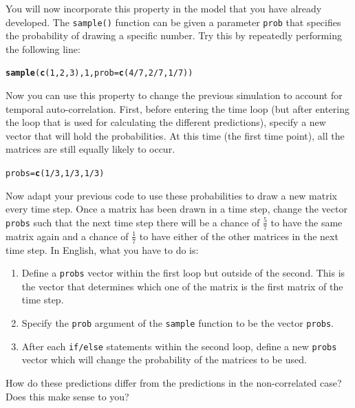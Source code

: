 \documentclass{article}\usepackage[]{graphicx}\usepackage[]{color}
\makeatletter
\newcommand{\hlnum}[1]{\textcolor[rgb]{0.686,0.059,0.569}{#1}}%
\newcommand{\hlopt}[1]{\textcolor[rgb]{0,0,0}{#1}}%
\newcommand{\hlstd}[1]{\textcolor[rgb]{0.345,0.345,0.345}{#1}}%
\newcommand{\hlkwb}[1]{\textcolor[rgb]{0.69,0.353,0.396}{#1}}%
\newcommand{\hlkwc}[1]{\textcolor[rgb]{0.333,0.667,0.333}{#1}}%
\newcommand{\hlkwd}[1]{\textcolor[rgb]{0.737,0.353,0.396}{\textbf{#1}}}%
\newenvironment{kframe}{%
 \def\at@end@of@kframe{}%
 \ifinner\ifhmode%
  \def\at@end@of@kframe{\end{minipage}}%
  \begin{minipage}{\columnwidth}%
 \fi\fi%
 \def\FrameCommand##1{\hskip\@totalleftmargin \hskip-\fboxsep
 \colorbox{shadecolor}{##1}\hskip-\fboxsep
     \hskip-\linewidth \hskip-\@totalleftmargin \hskip\columnwidth}%
 \MakeFramed {\advance\hsize-\width
   \@totalleftmargin\z@ \linewidth\hsize
   \@setminipage}}%
 {\par\unskip\endMakeFramed%
 \at@end@of@kframe}
\newenvironment{knitrout}{}{} %
\makeatother
\begin{document}
You will now incorporate this property in the model that you have already developed. The \texttt{sample()} function can be given a parameter \texttt{prob} that specifies the probability of drawing a specific number. Try this by repeatedly performing the following line:
\begin{knitrout}
\color{fgcolor}\begin{kframe}
\begin{alltt}
\hlkwd{sample}\hlstd{(}\hlkwd{c}\hlstd{(}\hlnum{1}\hlstd{,}\hlnum{2}\hlstd{,}\hlnum{3}\hlstd{),}\hlnum{1}\hlstd{,}\hlkwc{prob}\hlstd{=}\hlkwd{c}\hlstd{(}\hlnum{4}\hlopt{/}\hlnum{7}\hlstd{,}\hlnum{2}\hlopt{/}\hlnum{7}\hlstd{,}\hlnum{1}\hlopt{/}\hlnum{7}\hlstd{))}
\end{alltt}
\end{kframe}
\end{knitrout}
Now you can use this property to change the previous simulation to account for temporal auto-correlation. First, before entering the time loop (but after entering the loop that is used for calculating the different predictions), specify a new vector that will hold the probabilities. At this time (the first time point), all the matrices are still equally likely to occur.
\begin{knitrout}
\color{fgcolor}\begin{kframe}
\begin{alltt}
\hlstd{probs}\hlkwb{=}\hlkwd{c}\hlstd{(}\hlnum{1}\hlopt{/}\hlnum{3}\hlstd{,}\hlnum{1}\hlopt{/}\hlnum{3}\hlstd{,}\hlnum{1}\hlopt{/}\hlnum{3}\hlstd{)}
\end{alltt}
\end{kframe}
\end{knitrout}
Now adapt your previous code to use these probabilities to draw a new matrix every time step. Once a matrix has been drawn in a time step, change the vector \texttt{probs} such that the next time step there will be a chance of $\frac{5}{7}$ to have the same matrix again and a chance of $\frac{1}{7}$ to have either of the other matrices in the next time step. In English, what you have to do is:

\begin{enumerate}
\item Define a \texttt{probs} vector within the first loop but outside of the second. This is the vector that determines which one of the matrix is the first matrix of the time step.
\item Specify the \texttt{prob} argument of the \texttt{sample} function to be the vector \texttt{probs}.
\item After each \texttt{if/else} statements within the second loop, define a new \texttt{probs} vector which will change the probability of the matrices to be used.
\end{enumerate}
How do these predictions differ from the predictions in the non-correlated case? Does this make sense to you?
\end{document}
